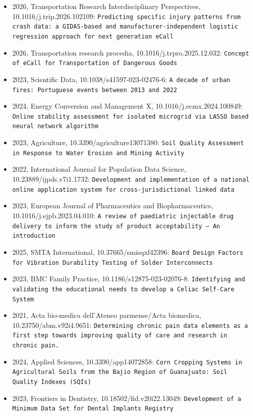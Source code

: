 \begin{itemize}
\item 2026, Transportation Research Interdisciplinary Perspectives, 10.1016/j.trip.2026.102109: \texttt{Predicting specific injury patterns from crash data: a GIDAS-based and manufacturer-independent logistic regression approach for next generation eCall}
\item 2026, Transportation research procedia, 10.1016/j.trpro.2025.12.032: \texttt{Concept of eCall for Transportation of Dangerous Goods}
\item 2023, Scientific Data, 10.1038/s41597-023-02476-6: \texttt{A decade of urban fires: Portuguese events between 2013 and 2022}
\item 2024, Energy Conversion and Management X, 10.1016/j.ecmx.2024.100849: \texttt{Online stability assessment for isolated microgrid via LASSO based neural network algorithm}
\item 2023, Agriculture, 10.3390/agriculture13071380: \texttt{Soil Quality Assessment in Response to Water Erosion and Mining Activity}
\item 2022, International Journal for Population Data Science, 10.23889/ijpds.v7i1.1732: \texttt{Development and implementation of a national online application system for cross-jurisdictional linked data}
\item 2023, European Journal of Pharmaceutics and Biopharmaceutics, 10.1016/j.ejpb.2023.04.010: \texttt{A review of paediatric injectable drug delivery to inform the study of product acceptability -- An introduction}
\item 2025, SMTA International, 10.37665/smisqxf42396: \texttt{Board Design Factors for Vibration Durability Testing of Solder Interconnects}
\item 2023, BMC Family Practice, 10.1186/s12875-023-02076-8: \texttt{Identifying and validating the educational needs to develop a Celiac Self-Care System}
\item 2021, Acta bio-medica dell'Ateneo parmense/Acta biomedica, 10.23750/abm.v92i4.9651: \texttt{Determining chronic pain data elements as a first step towards improving quality of care and research in chronic pain.}
\item 2024, Applied Sciences, 10.3390/app14072858: \texttt{Corn Cropping Systems in Agricultural Soils from the Bajio Region of Guanajuato: Soil Quality Indexes (SQIs)}
\item 2023, Frontiers in Dentistry, 10.18502/fid.v20i22.13049: \texttt{Development of a Minimum Data Set for Dental Implants Registry}

\end{itemize}

